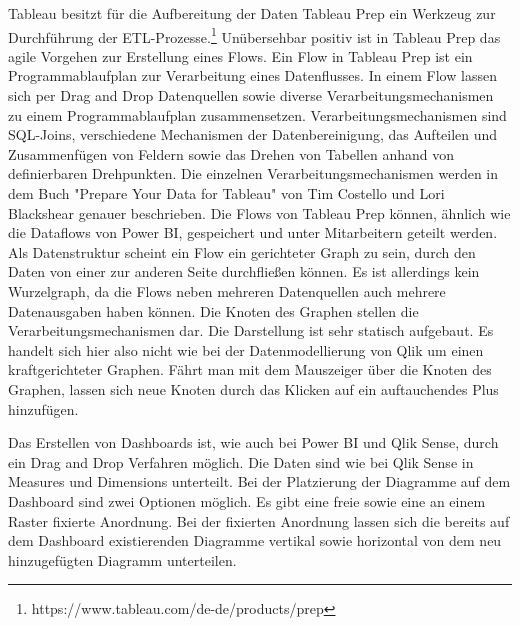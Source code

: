 Tableau besitzt für die Aufbereitung der Daten Tableau Prep ein Werkzeug zur Durchführung der
ETL-Prozesse.\footnote{https://www.tableau.com/de-de/products/prep} Unübersehbar positiv ist
in Tableau Prep das agile Vorgehen zur Erstellung eines Flows. Ein Flow in Tableau Prep ist ein Programmablaufplan
zur Verarbeitung eines Datenflusses. In einem Flow lassen sich per Drag and Drop Datenquellen sowie diverse Verarbeitungsmechanismen zu einem Programmablaufplan
zusammensetzen. Verarbeitungsmechanismen sind SQL-Joins, verschiedene Mechanismen der Datenbereinigung,
das Aufteilen und Zusammenfügen von Feldern sowie das Drehen von Tabellen anhand von definierbaren Drehpunkten.
Die einzelnen Verarbeitungsmechanismen werden in dem Buch "Prepare Your Data for Tableau" von Tim Costello und
Lori Blackshear genauer beschrieben.\cite{PrepareYourDataForTableauBook} Die Flows von Tableau Prep können,
ähnlich wie die Dataflows von Power BI, gespeichert und unter Mitarbeitern geteilt werden. Als Datenstruktur
scheint ein Flow ein gerichteter Graph zu sein, durch den Daten von einer zur anderen Seite durchfließen
können. Es ist allerdings kein Wurzelgraph, da die Flows neben mehreren Datenquellen auch mehrere Datenausgaben
haben können. Die Knoten des Graphen stellen die Verarbeitungsmechanismen dar. Die Darstellung ist sehr statisch
aufgebaut. Es handelt sich hier also nicht wie bei der Datenmodellierung von Qlik um einen kraftgerichteter Graphen.
Fährt man mit dem Mauszeiger über die Knoten des Graphen, lassen sich neue Knoten durch das Klicken auf ein
auftauchendes Plus hinzufügen.

Das Erstellen von Dashboards ist, wie auch bei Power BI und Qlik Sense, durch ein Drag and Drop Verfahren möglich.
Die Daten sind wie bei Qlik Sense in Measures und Dimensions unterteilt. Bei der Platzierung der Diagramme auf dem
Dashboard sind zwei Optionen möglich. Es gibt eine freie sowie eine an einem Raster fixierte Anordnung. Bei der fixierten
Anordnung lassen sich die bereits auf dem Dashboard existierenden Diagramme vertikal sowie horizontal von dem neu 
hinzugefügten Diagramm unterteilen.
